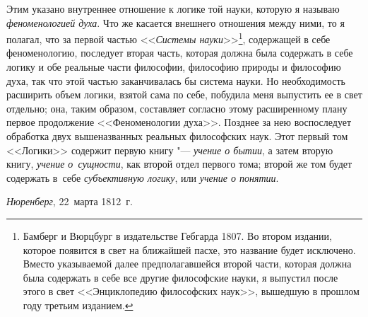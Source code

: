 Этим указано внутреннее отношение к логике той науки, которую я называю
{\em феноменологией духа}. Что же касается внешнего отношения между ними, то я
полагал, что за первой частью <<{\em Системы науки}>>\footnote{Бамберг и
Вюрцбург в издательстве Гебгарда 1807. Во втором издании, которое появится в
свет на ближайшей пасхе, это название будет исключено. Вместо указываемой далее
предполагавшейся второй части, которая должна была содержать в себе все другие
философские науки, я выпустил после этого в свет <<Энциклопедию философских
наук>>, вышедшую в прошлом году третьим изданием.}, содержащей в себе
феноменологию, последует вторая часть, которая должна была содержать в себе
логику и обе реальные части философии, философию природы и философию духа, так
что этой частью заканчивалась бы система науки. Но необходимость расширить
объем логики, взятой сама по себе, побудила меня выпустить ее в свет отдельно;
она, таким образом, составляет согласно этому расширенному плану первое
продолжение <<Феноменологии духа>>. Позднее за нею воспоследует обработка двух
вышеназванных реальных философских наук. Этот первый том <<Логики>> содержит
первую книгу "--- {\em учение о бытии}, а затем вторую книгу,
{\em учение о~сущности}, как второй отдел первого тома; второй же том будет
содержать в~себе {\em субъективную логику}, или {\em учение о понятии}.

{\em Нюренберг}, 22~марта 1812~г.

